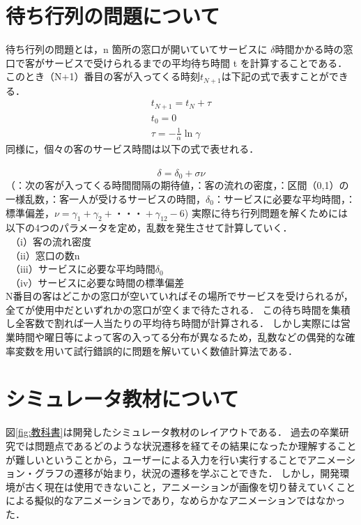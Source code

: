 \documentclass[twocolumn,10pt,a4j]{ltjsarticle}
\begin{document}
\section{待ち行列の問題について}
待ち行列の問題とは，n 箇所の窓口が開いていてサービスに $\delta$時間かかる時の窓口で客がサービスで受けられるまでの平均待ち時間 t を計算することである．
このとき（N+1）番目の客が入ってくる時刻$t_{N+1}$は下記の式で表すことができる．\cite{text}\\
\vspace{-11mm}
\begin{eqnarray}
t_{N+1}=t_N+\tau\\
t_0=0\\　
\tau=-\frac{1}{\alpha}\ln\gamma
\end{eqnarray}
同様に，個々の客のサービス時間は以下の式で表せれる．\\　
\vspace{-5mm}
\begin{equation}
\delta=\delta_0+\sigma\nu
\end{equation}
\vspace{-1mm}
（\tau：次の客が入ってくる時間間隔の期待値，\alpha：客の流れの密度，\gamma：区間（0,1）の一様乱数，\delta：客一人が受けるサービスの時間，$\delta_0$：サービスに必要な平均時間，\sigma：標準偏差，$\nu=\gamma_1+\gamma_2+・・・+\gamma_{12}-6$)
実際に待ち行列問題を解くためには以下の4つのパラメータを定め，乱数を発生させて計算していく．\\
　（i）客の流れ密度\alpha\\
　（ii）窓口の数n\\
　（iii）サービスに必要な平均時間$\delta_0$\\
　（iv）サービスに必要な時間の標準偏差\sigma\\

N番目の客はどこかの窓口が空いていればその場所でサービスを受けられるが，全てが使用中だといずれかの窓口が空くまで待たされる．
この待ち時間を集積し全客数で割れば一人当たりの平均待ち時間が計算される．
しかし実際には営業時間や曜日等によって客の入ってる分布が異なるため，乱数などの偶発的な確率変数を用いて試行錯誤的に問題を解いていく数値計算法である．


\section{シミュレータ教材について}
図\ref{fig:教科書}は開発したシミュレータ教材のレイアウトである．
過去の卒業研究では問題点であるどのような状況遷移を経てその結果になったか理解することが難しいということから，ユーザーによる入力を行い実行することでアニメーション・グラフの遷移が始まり，状況の遷移を学ぶことできた．
しかし，開発環境が古く現在は使用できないこと，アニメーションが画像を切り替えていくことによる擬似的なアニメーションであり，なめらかなアニメーションではなかった．
\end{document}
